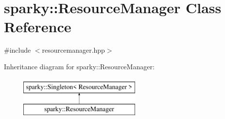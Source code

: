 \hypertarget{classsparky_1_1_resource_manager}{}\section{sparky\+:\+:Resource\+Manager Class Reference}
\label{classsparky_1_1_resource_manager}


{\ttfamily \#include $<$resourcemanager.\+hpp$>$}

Inheritance diagram for sparky\+:\+:Resource\+Manager\+:\begin{figure}[H]
\begin{center}
\leavevmode
\includegraphics[height=2.000000cm]{classsparky_1_1_resource_manager}
\end{center}
\end{figure}
